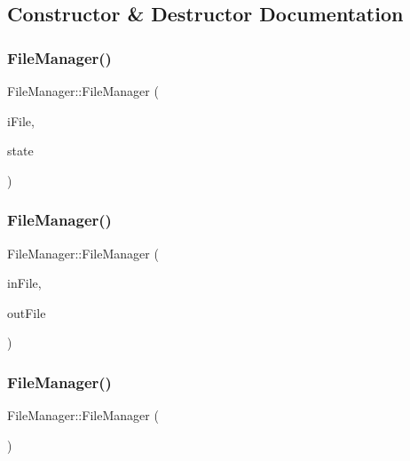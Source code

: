 \subsection{Constructor \& Destructor Documentation}
\hypertarget{class_file_manager_a62d69473c95f8df25e44d2466bb00dc5}{}\label{class_file_manager_a62d69473c95f8df25e44d2466bb00dc5} 
\subsubsection{\texorpdfstring{File\+Manager()}{FileManager()}\hspace{0.1cm}{\footnotesize\ttfamily [1/3]}}
{\footnotesize\ttfamily File\+Manager\+::\+File\+Manager (\begin{DoxyParamCaption}\item[{string}]{i\+File,  }\item[{\hyperlink{_structures_8h_a57306ae0f9e356347388234ed69e0ce7}{File\+State}}]{state }\end{DoxyParamCaption})}

\hypertarget{class_file_manager_a2456e56bdcb617c3ee75521cf9dd7057}{}\label{class_file_manager_a2456e56bdcb617c3ee75521cf9dd7057} 
\subsubsection{\texorpdfstring{File\+Manager()}{FileManager()}\hspace{0.1cm}{\footnotesize\ttfamily [2/3]}}
{\footnotesize\ttfamily File\+Manager\+::\+File\+Manager (\begin{DoxyParamCaption}\item[{string}]{in\+File,  }\item[{string}]{out\+File }\end{DoxyParamCaption})}

\hypertarget{class_file_manager_a8afd512c06be9daf140cc19d71f9b391}{}\label{class_file_manager_a8afd512c06be9daf140cc19d71f9b391} 
\subsubsection{\texorpdfstring{File\+Manager()}{FileManager()}\hspace{0.1cm}{\footnotesize\ttfamily [3/3]}}
{\footnotesize\ttfamily File\+Manager\+::\+File\+Manager (\begin{DoxyParamCaption}{ }\end{DoxyParamCaption})}


